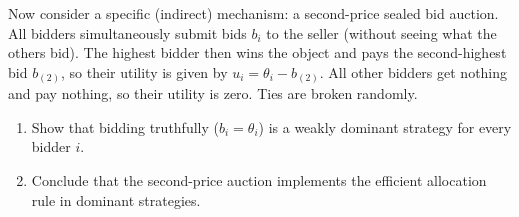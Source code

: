 \documentclass[a4paper]{article}
\newif\ifsolutions
\begin{document}
Now consider a specific (indirect) mechanism: a second-price sealed bid auction.
All bidders simultaneously submit bids $b_i$ to the seller (without seeing what the others bid). The highest bidder then wins the object and pays the second-highest bid $b_{(2)}$, so their utility is given by $u_i = \theta_i - b_{(2)}$. All other bidders get nothing and pay nothing, so their utility is zero. Ties are broken randomly.
\begin{enumerate}[resume]
	\item Show that bidding truthfully ($b_i=\theta_i$) is a weakly dominant strategy for every bidder $i$.
	\item Conclude that the second-price auction implements the efficient allocation rule in dominant strategies.
\end{enumerate}

\ifsolutions
\end{document}
